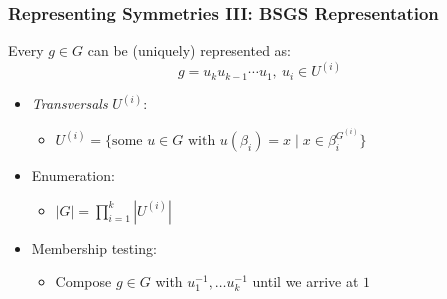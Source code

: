 \documentclass{beamer}
\begin{document}
\begin{frame}
  \frametitle{Representing Symmetries III: BSGS Representation}

  \begin{theorem}
    Every $g \in G$ can be (uniquely) represented as:
    \begin{equation*}
      g = u_k u_{k-1} \cdots u_1,\ u_i \in U^{(i)}
    \end{equation*}
  \end{theorem}

  \vspace{.25cm}

  \begin{itemize}
    \setlength\itemsep{.25cm}

    \item<2-> \textit{Transversals} $U^{(i)}$:
      \begin{itemize}
        \item $U^{(i)} = \{\text{some $u \in G$ with $u(\beta_i) = x$} \mid
                           x \in \beta_i^{G^{(i)}}\}$
      \end{itemize}
    \item<3-> Enumeration:
      \begin{itemize}
        \item $|G| = \prod_{i=1}^k |U^{(i)}|$
      \end{itemize}
    \item<4-> Membership testing:
      \begin{itemize}
        \item Compose $g \in G$ with $u_1^{-1}, \dots u_k^{-1}$ until we arrive at $1$
      \end{itemize}
  \end{itemize}
\end{frame}
\end{document}
